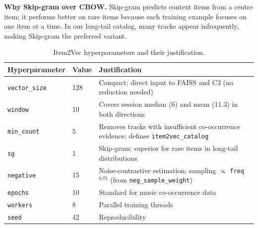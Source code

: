 \documentclass[11pt]{article}
\begin{document}
\textbf{Why Skip-gram over CBOW.}
Skip-gram predicts context items from a centre item; it performs
better on rare items because each training example focuses on one
item at a time. In our long-tail catalog, many tracks appear
infrequently, making Skip-gram the preferred variant.

\begin{table}[H]
\centering
\caption{Item2Vec hyperparameters and their justification.}
\label{tab:i2v_hyperparams}
\begin{tabular}{lll}
\toprule
\textbf{Hyperparameter} & \textbf{Value} & \textbf{Justification} \\
\midrule
\texttt{vector\_size} & 128 &
  Compact; direct input to FAISS and C3 (no reduction needed) \\
\texttt{window} & 10 &
  Covers session median (6) and mean (11.3) in both directions \\
\texttt{min\_count} & 5 &
  Removes tracks with insufficient co-occurrence evidence;
  defines \texttt{item2vec\_catalog} \\
\texttt{sg} & 1 &
  Skip-gram; superior for rare items in long-tail distributions \\
\texttt{negative} & 15 &
  Noise-contrastive estimation; sampling $\propto$
  \texttt{freq}$^{0.75}$ (from \texttt{neg\_sample\_weight}) \\
\texttt{epochs} & 10 & Standard for music co-occurrence data \\
\texttt{workers} & 8 & Parallel training threads \\
\texttt{seed} & 42 & Reproducibility \\
\bottomrule
\end{tabular}
\end{table}
\end{document}
